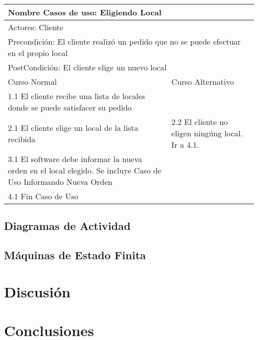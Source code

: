 \documentclass[a4paper,10pt]{article}
\begin{document}
\bigskip

\begin{center}
\begin{tabularx}{14cm}{|X|X|}
\hline
\multicolumn{2}{|l|}{Nombre Casos de uso: Eligiendo Local}\\
\hline
\multicolumn{2}{|l|}{Actores: Cliente}\\
\hline
\multicolumn{2}{|l|}{Precondici\'on: El cliente realiz\'o un pedido que no se puede efectuar en el propio local}\\
\hline
\multicolumn{2}{|l|}{PostCondici\'on: El cliente elige un nuevo local}\\
\hline
Curso Normal & Curso Alternativo\\
\hline
1.1 El cliente recibe una lista de locales donde se puede satisfacer su pedido & 
\\
\hline
2.1 El cliente elige un local de la lista recibida & 2.2 El cliente no eligen ning\'ung local. Ir a 4.1.
\\
\hline
3.1 El software debe informar la nueva orden en el local elegido. Se incluye Caso de Uso Informando Nueva Orden &
\\
\hline
4.1 Fin Caso de Uso &
\\
\hline
\end{tabularx}
\end{center}






\subsection*{Diagramas de Actividad}

\subsection*{M\'aquinas de Estado Finita}


\newpage


\section*{Discusi\'on}




\newpage
\section*{Conclusiones}
\end{document}
